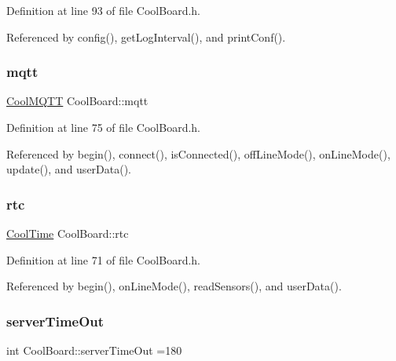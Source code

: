 Definition at line 93 of file Cool\+Board.\+h.



Referenced by config(), get\+Log\+Interval(), and print\+Conf().

\mbox{\label{classCoolBoard_a2399f44d7c23c1149a335cb3b46d90f1}} 
\subsubsection{\texorpdfstring{mqtt}{mqtt}}
{\footnotesize\ttfamily \hyperlink{classCoolMQTT}{Cool\+M\+Q\+TT} Cool\+Board\+::mqtt\hspace{0.3cm}{\ttfamily [private]}}



Definition at line 75 of file Cool\+Board.\+h.



Referenced by begin(), connect(), is\+Connected(), off\+Line\+Mode(), on\+Line\+Mode(), update(), and user\+Data().

\mbox{\label{classCoolBoard_a50d2a6716879d64a85f3c6b44ad63275}} 
\subsubsection{\texorpdfstring{rtc}{rtc}}
{\footnotesize\ttfamily \hyperlink{classCoolTime}{Cool\+Time} Cool\+Board\+::rtc\hspace{0.3cm}{\ttfamily [private]}}



Definition at line 71 of file Cool\+Board.\+h.



Referenced by begin(), on\+Line\+Mode(), read\+Sensors(), and user\+Data().

\mbox{\label{classCoolBoard_a7a8d8d3d316220cdd049cd63c1aa8fe6}} 
\subsubsection{\texorpdfstring{server\+Time\+Out}{serverTimeOut}}
{\footnotesize\ttfamily int Cool\+Board\+::server\+Time\+Out =180\hspace{0.3cm}{\ttfamily [private]}}



